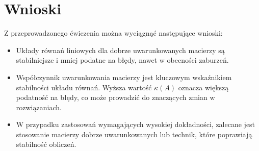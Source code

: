 \documentclass[a4paper, 12pt]{article}
\begin{document}
\section{Wnioski}
Z przeprowadzonego ćwiczenia można wyciągnąć następujące wnioski:
\begin{itemize}
    \item Układy równań liniowych dla dobrze uwarunkowanych macierzy są stabilniejsze i mniej podatne na błędy, nawet w obecności zaburzeń.
    \item Współczynnik uwarunkowania macierzy jest kluczowym wskaźnikiem stabilności układu równań. Wyższa wartość \( \kappa(A) \) oznacza większą podatność na błędy, co może prowadzić do znaczących zmian w rozwiązaniach.
    \item W przypadku zastosowań wymagających wysokiej dokładności, zalecane jest stosowanie macierzy dobrze uwarunkowanych lub technik, które poprawiają stabilność obliczeń.
\end{itemize}
\end{document}
